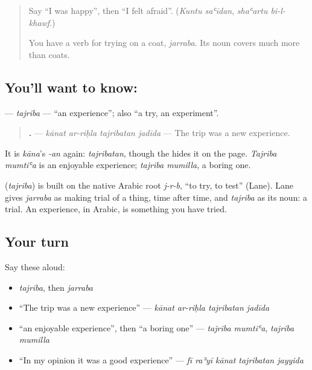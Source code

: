 \label{lesson:AR-C289-tajriba}



\begin{quote}
Say \textquotedblleft{}I was happy\textquotedblright{}, then \textquotedblleft{}I felt afraid\textquotedblright{}. (\emph{Kuntu saʿīdan}, \emph{shaʿartu bi-l-khawf}.)

You have a verb for trying on a coat, \emph{jarraba}. Its noun covers much more than coats.
\end{quote}

\subsection*{You'll want to know: }
\textbf{} — \emph{tajriba} — \textquotedblleft{}an experience\textquotedblright{}; also \textquotedblleft{}a try, an experiment\textquotedblright{}.

\begin{quote}
\textbf{   .} — \emph{kānat ar-riḥla tajribatan jadīda} — The trip was a new experience.
\end{quote}

It is \emph{kāna}'s \emph{-an} again: \emph{tajribatan}, though the \textbf{} hides it on the page. \emph{Tajriba mumtiʿa} is an enjoyable experience; \emph{tajriba mumilla}, a boring one.

\begin{cousinweb}
\textbf{} (\emph{tajriba}) is built on the native Arabic root \emph{j-r-b}, \textquotedblleft{}to try, to test\textquotedblright{} (Lane). Lane gives \emph{jarraba} as making trial of a thing, time after time, and \emph{tajriba} as its noun: a trial. An experience, in Arabic, is something you have tried.
\end{cousinweb}

\subsection*{Your turn}
Say these aloud:

\begin{itemize}
\raggedright
  \item \emph{tajriba}, then \emph{jarraba}
  \item \textquotedblleft{}The trip was a new experience\textquotedblright{} — \emph{kānat ar-riḥla tajribatan jadīda}
  \item \textquotedblleft{}an enjoyable experience\textquotedblright{}, then \textquotedblleft{}a boring one\textquotedblright{} — \emph{tajriba mumtiʿa}, \emph{tajriba mumilla}
  \item \textquotedblleft{}In my opinion it was a good experience\textquotedblright{} — \emph{fī raʾyī kānat tajribatan jayyida}
\end{itemize}

